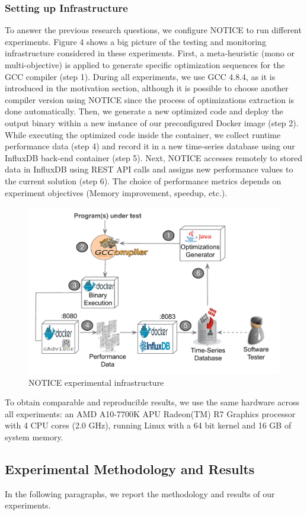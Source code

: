 \subsubsection{Setting up Infrastructure}
To answer the previous research questions, we configure NOTICE to run different experiments. Figure 4 shows a big picture of the testing and monitoring infrastructure considered in these experiments. 
First, a meta-heuristic (mono or multi-objective) is applied to generate specific optimization sequences for the GCC compiler (step 1). During all experiments, we use GCC 4.8.4, as it is introduced in the motivation section, although it is possible to choose another compiler version using NOTICE since the process of optimizations extraction is done automatically. 
Then, we generate a new optimized code and deploy the output binary within a new instance of our preconfigured Docker image (step 2). While executing the optimized code inside the container, we collect runtime performance data (step 4) and record it in a new time-series database using our InfluxDB back-end container (step 5). Next, NOTICE accesses remotely to stored data in InfluxDB using REST API calls and assigns new performance values to the current solution (step 6). The choice of performance metrics depends on experiment objectives (Memory improvement, speedup, etc.).
\begin{figure}[h]
	\centering
	\includegraphics[width=0.8\linewidth]{chapitre3/fig/infraup.pdf}
	\caption{NOTICE experimental infrastructure}
\end{figure}

To obtain comparable and reproducible results, we use the same hardware across all experiments: an AMD A10-7700K APU Radeon(TM) R7 Graphics processor with 4 CPU cores (2.0 GHz), running Linux with a 64 bit kernel and 16 GB of system memory.


\subsection{Experimental Methodology and Results}
In the following paragraphs, we report the methodology and results of our experiments.

